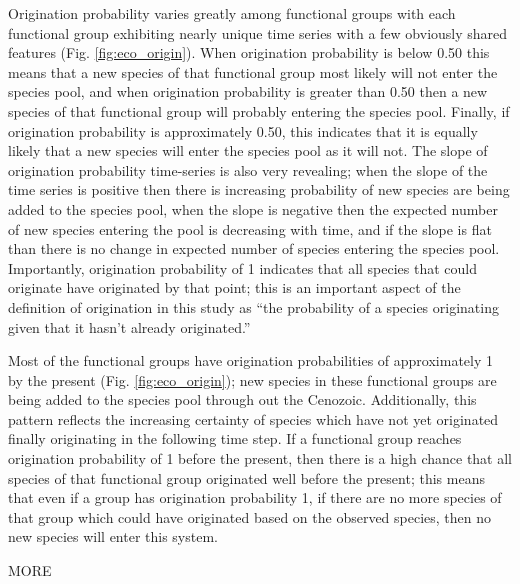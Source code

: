 \documentclass[12pt,letterpaper]{article}
\begin{document}
Origination probability varies greatly among functional groups with each functional group exhibiting nearly unique time series with a few obviously shared features (Fig. \ref{fig:eco_origin}). When origination probability is below 0.50 this means that a new species of that functional group most likely will not enter the species pool, and when origination probability is greater than 0.50 then a new species of that functional group will probably entering the species pool. Finally, if origination probability is approximately 0.50, this indicates that it is equally likely that a new species will enter the species pool as it will not. The slope of origination probability time-series is also very revealing; when the slope of the time series is positive then there is increasing probability of new species are being added to the species pool, when the slope is negative then the expected number of new species entering the pool is decreasing with time, and if the slope is flat than there is no change in expected number of species entering the species pool. Importantly, origination probability of 1 indicates that all species that could originate have originated by that point; this is an important aspect of the definition of origination in this study as ``the probability of a species originating given that it hasn't already originated.'' %

Most of the functional groups have origination probabilities of approximately 1 by the present (Fig. \ref{fig:eco_origin}); new species in these functional groups are being added to the species pool through out the Cenozoic. Additionally, this pattern reflects the increasing certainty of species which have not yet originated finally originating in the following time step. If a functional group reaches origination probability of 1 before the present, then there is a high chance that all species of that functional group originated well before the present; this means that even if a group has origination probability 1, if there are no more species of that group which could have originated based on the observed species, then no new species will enter this system.

\uppercase{more}
\end{document}
